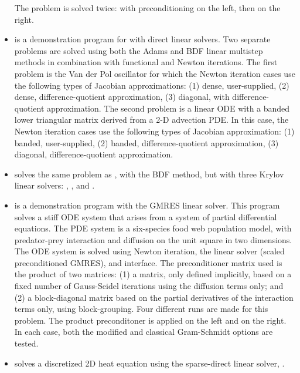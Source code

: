 \begin{itemize}
  The problem is solved twice: with preconditioning on the left,
  then on the right.
\item {}
  is a demonstration program for {\cvode} with direct linear solvers.
  \newline
  Two separate problems are solved using both the Adams and BDF linear
  multistep methods in combination with functional and Newton
  iterations. 
  \newline
  The first problem is the Van der Pol oscillator for which 
  the Newton iteration cases use the following types of Jacobian approximations:
  (1) dense, user-supplied, (2) dense, difference-quotient approximation, 
  (3) diagonal, with difference-quotient approximation. The second
  problem is a linear ODE with a  
  banded lower triangular matrix derived from a 2-D advection PDE. In this
  case, the Newton iteration cases use the following types of Jacobian
  approximation: (1) banded, user-supplied, (2) banded, difference-quotient
  approximation, (3) diagonal, difference-quotient approximation.
\item {}
  solves the same problem as , with the BDF method, but with
  three Krylov linear solvers: {\sunlinsolspgmr}, {\sunlinsolspbcgs},
  and {\sunlinsolsptfqmr}. 
\item {}
  is a demonstration program with the GMRES linear solver.
  \newline
  This program solves a stiff ODE system that arises from a system     
  of partial differential equations.  The PDE system is a six-species
  food web population model, with predator-prey interaction and diffusion 
  on the unit square in two dimensions.
  \newline
  The ODE system is solved using Newton iteration, the
  {\sunlinsolspgmr} linear solver (scaled preconditioned GMRES), and
  {\cvspils} interface.
  \newline
  The preconditioner matrix used is the product of two matrices:         
  (1) a matrix, only defined implicitly, based on a fixed number of     
  Gauss-Seidel iterations using the diffusion terms only; and               
  (2) a block-diagonal matrix based on the partial derivatives of the   
  interaction terms only, using block-grouping.                          
  \newline
  Four different runs are made for this problem.                        
  The product preconditoner is applied on the left and on the right.    
  In each case, both the modified and classical Gram-Schmidt options    
  are tested.
\item {} solves a discretized 2D heat equation using
  the {\klu} sparse-direct linear solver, {\sunlinsolklu}.
\end{itemize}

